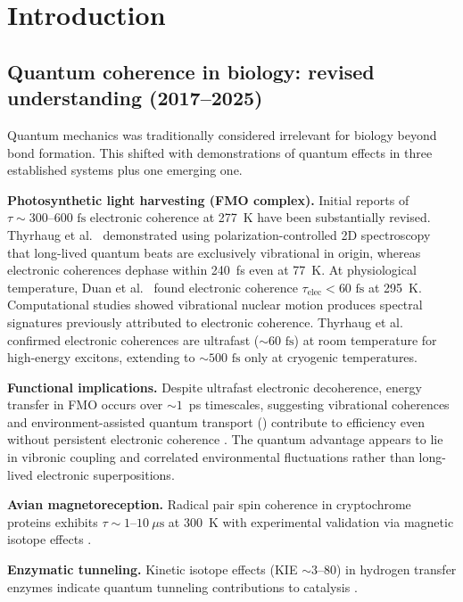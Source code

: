 \documentclass[twocolumn,10pt]{article}
\newcommand{\fs}{\text{~fs}}
\newcommand{\ENAQT}{\text{ENAQT}}
\begin{document}
\section{Introduction}

\subsection{Quantum coherence in biology: revised understanding (2017--2025)}

Quantum mechanics was traditionally considered irrelevant for biology beyond
bond formation. This shifted with demonstrations of quantum effects in three
established systems plus one emerging one.

\textbf{Photosynthetic light harvesting (FMO complex).} Initial reports
\cite{Engel2007,Panitchayangkoon2010} of $\tau \sim 300\text{--}600\fs$
electronic coherence at 277~K have been substantially revised. Thyrhaug
et al.\ \cite{Thyrhaug2018} demonstrated using polarization-controlled 2D
spectroscopy that long-lived quantum beats are exclusively vibrational in
origin, whereas electronic coherences dephase within 240~fs even at 77~K.
At physiological temperature, Duan et al.\ \cite{Duan2017} found electronic
coherence $\tau_{\text{elec}} < 60\fs$ at 295~K. Computational studies
\cite{Tiwari2013,Christensson2012,Tempelaar2014} showed vibrational nuclear
motion produces spectral signatures previously attributed to electronic
coherence. Thyrhaug et al.\ \cite{Thyrhaug2022b} confirmed electronic
coherences are ultrafast ($\sim 60\fs$) at room temperature for high-energy
excitons, extending to $\sim 500\fs$ only at cryogenic temperatures.

\textbf{Functional implications.} Despite ultrafast electronic decoherence,
energy transfer in FMO occurs over $\sim 1$~ps timescales, suggesting
vibrational coherences and environment-assisted quantum transport
(\ENAQT) \cite{Plenio2008} contribute to efficiency even without persistent
electronic coherence \cite{Cao2020}. The quantum advantage appears to lie
in vibronic coupling \cite{Chin2013} and correlated environmental
fluctuations rather than long-lived electronic superpositions.

\textbf{Avian magnetoreception.} Radical pair spin coherence in cryptochrome
proteins exhibits $\tau \sim 1\text{--}10~\mu\text{s}$ at 300~K with
experimental validation via magnetic isotope effects
\cite{Ritz2000,Maeda2012,Gauger2011}.

\textbf{Enzymatic tunneling.} Kinetic isotope effects (KIE $\sim 3\text{--}80$)
in hydrogen transfer enzymes indicate quantum tunneling contributions to
catalysis \cite{Scrutton1999,Klinman2013}.
\end{document}
